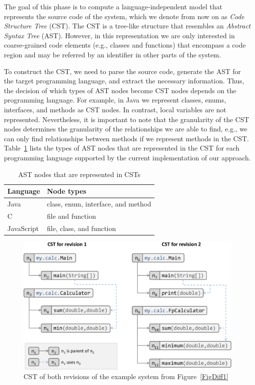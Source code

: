 The goal of this phase is to compute a language-independent model that represents the source code of the system, which we denote from now on as \emph{Code Structure Tree} (CST). The CST is a tree-like structure that resembles an \emph{Abstract Syntax Tree} (AST). However, in this representation we are only interested in coarse-grained code elements (e.g., classes and functions) that encompass a code region and may be referred by an identifier in other parts of the system.

To construct the CST, we need to parse the source code, generate the AST for the target programming language, and extract the necessary information.
Thus, the decision of which types of AST nodes become CST nodes depends on the programming language.
For example, in Java we represent classes, enums, interfaces, and methods as CST nodes.
In contrast, local variables are not represented.
Nevertheless, it is important to note that the granularity of the CST nodes determines the granularity of the relationships we are able to find, e.g., we can only find relationships between methods if we represent methods in the CST.
Table~\ref{TabCstNodes} lists the types of AST nodes that are represented in the CST for each programming language supported by the current implementation of our approach.

\begin{table}[htbp]
\renewcommand{\arraystretch}{1.2}
\caption{AST nodes that are represented in CSTs}
\label{TabCstNodes}
\centering
\begin{tabular}{@{}ll@{}}
\toprule
Language & Node types \\
\midrule
Java & class, enum, interface, and method \\
C & file and function \\
JavaScript & file, class, and function \\
\bottomrule
\end{tabular}
\end{table}

\begin{figure}[htb]
\centering
\includegraphics[width=1.0\linewidth]{img-cstDiff1.pdf}
\caption{CST of both revisions of the example system from Figure~\ref{FigDiff1}}
\label{FigJavaToCst}
\end{figure}

